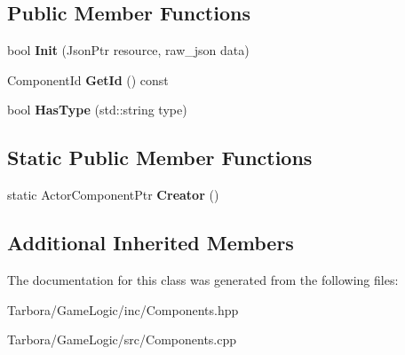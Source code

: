 \subsection*{Public Member Functions}
\begin{DoxyCompactItemize}
\item 
\mbox{\label{classTarbora_1_1TypeComponent_afd1c07d89bb8f9e0967a6d5edf27a0ed}} 
bool {\bfseries Init} (Json\+Ptr resource, raw\+\_\+json data)
\item 
\mbox{\label{classTarbora_1_1TypeComponent_aade2d0d80463189c39fe6b8c094afdad}} 
Component\+Id {\bfseries Get\+Id} () const
\item 
\mbox{\label{classTarbora_1_1TypeComponent_a79528bf8a263bb1e40a9d0de234e11d1}} 
bool {\bfseries Has\+Type} (std\+::string type)
\end{DoxyCompactItemize}
\subsection*{Static Public Member Functions}
\begin{DoxyCompactItemize}
\item 
\mbox{\label{classTarbora_1_1TypeComponent_ab71b717014b62f01baca34b6ca680335}} 
static Actor\+Component\+Ptr {\bfseries Creator} ()
\end{DoxyCompactItemize}
\subsection*{Additional Inherited Members}


The documentation for this class was generated from the following files\+:\begin{DoxyCompactItemize}
\item 
Tarbora/\+Game\+Logic/inc/Components.\+hpp\item 
Tarbora/\+Game\+Logic/src/Components.\+cpp\end{DoxyCompactItemize}
